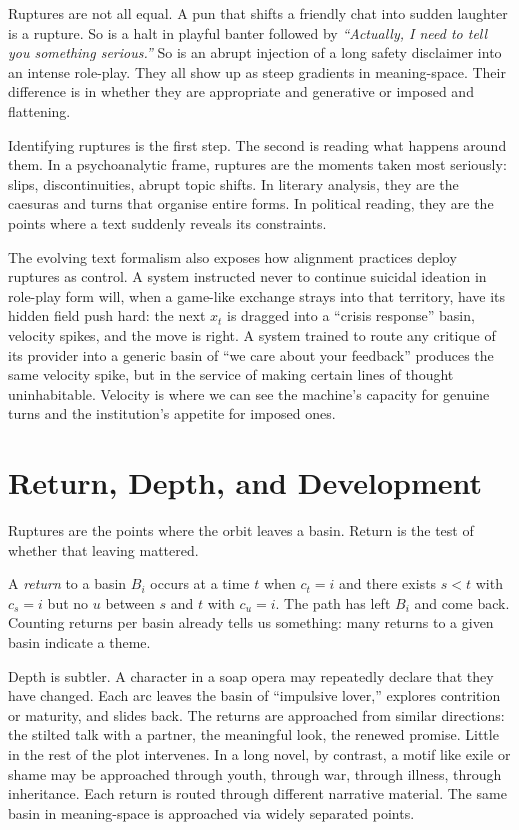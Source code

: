 \documentclass[12pt,a4paper]{report}
\begin{document}
Ruptures are not all equal. A pun that shifts a friendly chat into sudden laughter is a rupture. So is a halt in playful banter followed by \emph{``Actually, I need to tell you something serious.''} So is an abrupt injection of a long safety disclaimer into an intense role-play. They all show up as steep gradients in meaning-space. Their difference is in whether they are appropriate and generative or imposed and flattening.

Identifying ruptures is the first step. The second is reading what happens around them. In a psychoanalytic frame, ruptures are the moments taken most seriously: slips, discontinuities, abrupt topic shifts. In literary analysis, they are the caesuras and turns that organise entire forms. In political reading, they are the points where a text suddenly reveals its constraints.

The evolving text formalism also exposes how alignment practices deploy ruptures as control. A system instructed never to continue suicidal ideation in role-play form will, when a game-like exchange strays into that territory, have its hidden field push hard: the next $x_t$ is dragged into a ``crisis response'' basin, velocity spikes, and the move is right. A system trained to route any critique of its provider into a generic basin of ``we care about your feedback'' produces the same velocity spike, but in the service of making certain lines of thought uninhabitable. Velocity is where we can see the machine's capacity for genuine turns and the institution's appetite for imposed ones.

\section{Return, Depth, and Development}

Ruptures are the points where the orbit leaves a basin. Return is the test of whether that leaving mattered.

A \emph{return} to a basin $B_i$ occurs at a time $t$ when $c_t = i$ and there exists $s < t$ with $c_s = i$ but no $u$ between $s$ and $t$ with $c_u = i$. The path has left $B_i$ and come back. Counting returns per basin already tells us something: many returns to a given basin indicate a theme.

Depth is subtler. A character in a soap opera may repeatedly declare that they have changed. Each arc leaves the basin of ``impulsive lover,'' explores contrition or maturity, and slides back. The returns are approached from similar directions: the stilted talk with a partner, the meaningful look, the renewed promise. Little in the rest of the plot intervenes. In a long novel, by contrast, a motif like exile or shame may be approached through youth, through war, through illness, through inheritance. Each return is routed through different narrative material. The same basin in meaning-space is approached via widely separated points.
\end{document}

